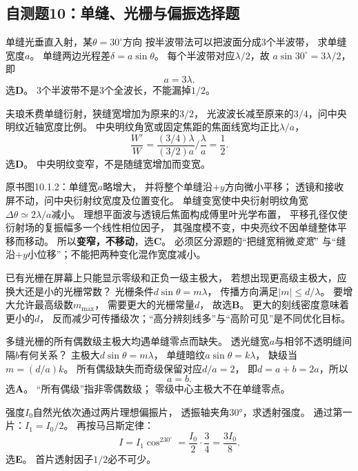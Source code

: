 \subsection{自测题10：单缝、光栅与偏振选择题}

\problemtext 单缝光垂直入射，某$\theta=30^\circ$方向
按半波带法可以把波面分成3个半波带，
求单缝宽度$a$。
\workings
单缝两边光程差$\delta=a\sin\theta$。
每个半波带对应$\lambda/2$，故
$a\sin30^\circ=3\lambda/2$，即
\[
\boxed{a=3\lambda}.
\]
选\textbf{D}。
\crosscheck 3个半波带不是3个全波长，不能漏掉$1/2$。

\problemtext 夫琅禾费单缝衍射，狭缝宽增加为原来的$3/2$，
光波波长减至原来的$3/4$，问中央明纹近轴宽度比例。
\workings
中央明纹角宽或固定焦距的焦面线宽均正比$\lambda/a$，
\[
\boxed{\frac{W'}W=
\frac{(3/4)\lambda}{(3/2)a}\bigg/
\frac{\lambda}{a}=\frac12}.
\]
选\textbf{D}。
\crosscheck 中央明纹变窄，不是随缝宽增加而变宽。

\problemtext 原书图10.1.2：单缝宽$a$略增大，
并将整个单缝沿$+y$方向微小平移；
透镜和接收屏不动，问中央衍射纹宽度及位置变化。
\workings
单缝变宽使中央衍射明纹角宽
$\Delta\theta\simeq2\lambda/a$减小。
理想平面波与透镜后焦面构成傅里叶光学布置，
平移孔径仅使衍射场的复振幅多一个线性相位因子，
其强度模不变，中央亮纹不因单缝整体平移而移动。
所以\textbf{变窄，不移动}，选\textbf{C}。
\crosscheck 必须区分源题的“把缝宽稍微\emph{变宽}”
与“缝沿$+y$小位移”；不能把两种变化混作宽度减小。

\problemtext 已有光栅在屏幕上只能显示零级和正负一级主极大，
若想出现更高级主极大，应换大还是小的光栅常数？
\workings
光栅条件$d\sin\theta=m\lambda$，
传播方向满足$|m|\le d/\lambda$。
要增大允许最高级数$m_{\max}$，
需要更大的光栅常量$d$，
故选\textbf{B}。
\crosscheck 更大的刻线密度意味着更小的$d$，
反而减少可传播级次；“高分辨刻线多”与“高阶可见”是不同优化目标。

\problemtext 多缝光栅的所有偶数级主极大均遇单缝零点而缺失。
透光缝宽$a$与相邻不透明缝间隔$b$有何关系？
\workings
主极大$d\sin\theta=m\lambda$，
单缝暗纹$a\sin\theta=k\lambda$，
缺级当$m=(d/a)k$。
所有偶级缺失而奇级保留对应$d/a=2$，
即$d=a+b=2a$，所以
\[
\boxed{a=b}.
\]
选\textbf{A}。
\crosscheck “所有偶级”指非零偶数级；
零级中心主极大不在单缝零点。

\problemtext 强度$I_0$自然光依次通过两片理想偏振片，
透振轴夹角30°，求透射强度。
\workings
通过第一片：$I_1=I_0/2$。
再按马吕斯定律：
\[
\boxed{I=I_1\cos^230^\circ
=\frac{I_0}{2}\cdot\frac34=\frac{3I_0}{8}}.
\]
选\textbf{E}。
\crosscheck 首片透射因子$1/2$必不可少。

